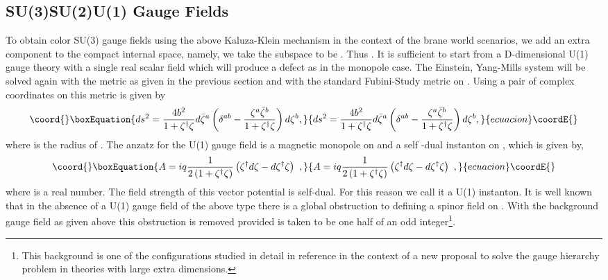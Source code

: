 \documentclass[a4paper,12pt]{article}
\begin{document}
\subsection{SU(3)\myHighlight{$\times$}\coordHE{}SU(2)\myHighlight{$\times$}\coordHE{}U(1) Gauge Fields}
To obtain color SU(3) gauge fields using the above Kaluza-Klein
mechanism in the context of the brane world scenarios, we add an
extra component to the compact internal space, namely, we take the
\coordHE{} subspace to be  \coordHE{}. Thus \coordHE{}. It is sufficient
to start from a D-dimensional U(1) gauge theory with a single real
scalar  field which will produce a defect as in the monopole case.
The Einstein, Yang-Mills system will be solved again with the \coordHE{}
metric as given in the previous section and with the standard
Fubini-Study metric on \coordHE{}. Using a pair of complex coordinates
\coordHE{} on \coordHE{} this metric is given by
\begin{equation}\coord{}\boxEquation{
 ds^2= \frac{4b^2}{1+\zeta^{\dag}\zeta}
d{\bar \zeta}^a \left(\delta^{ab}-
\frac{\zeta^a{\bar\zeta}^b}{1+\zeta^{\dag} \zeta}
\right)d\zeta^b,
}{
 ds^2= \frac{4b^2}{1+\zeta^{\dag}\zeta}
d{\bar \zeta}^a \left(\delta^{ab}-
\frac{\zeta^a{\bar\zeta}^b}{1+\zeta^{\dag} \zeta}
\right)d\zeta^b,
}{ecuacion}\coordE{}\end{equation}
where \coordHE{} is the radius of \coordHE{}. The anzatz for the U(1) gauge
field is a magnetic monopole on \coordHE{} and a self -dual instanton on
\coordHE{}, which is given by,
\begin{equation}\coord{}\boxEquation{
 A= iq \frac{1}{2\left(1+\zeta^{\dag}
\zeta\right)}\left(\zeta^\dag d\zeta - d\zeta^\dag \zeta
\right)~,
\label{a}
}{
 A= iq \frac{1}{2\left(1+\zeta^{\dag}
\zeta\right)}\left(\zeta^\dag d\zeta - d\zeta^\dag \zeta
\right)~,
}{ecuacion}\coordE{}\end{equation}
where \coordHE{} is a real number. The field strength of this vector
potential is self-dual. For this reason we call it a U(1) instanton.
It is well known that in the absence of a U(1) gauge field of the
above type there is a global obstruction to defining a spinor field
on \coordHE{}. With the background gauge field as given above this
obstruction is removed provided \coordHE{} is taken to be one half of an odd
integer\footnote{This background is one of the configurations studied
in detail in reference \cite{Dvali:2001qr} in the context of a  new
proposal to solve the gauge hierarchy problem in theories with large
extra dimensions.}.
\end{document}
